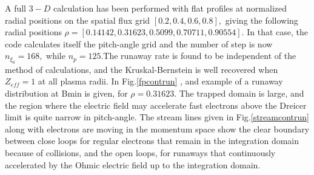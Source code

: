 A full $3-D$ calculation has been performed with flat profiles at normalized
radial positions on the spatial flux grid $\left[ 0.2,0.4,0.6,0.8\right] ,$
giving the following radial positions $\rho =\left[
0.14142,0.31623,0.5099,0.70711,0.90554\right] $. In that case, the code
calculates itself the pitch-angle grid and the number of step is now $n_{\xi
_{0}}=168,$ while $n_{p}=125.$The runaway rate is found to be independent of
the method of calculations, and the Kruskal-Bernstein is well recovered when
$Z_{eff}=1$ at all plasma radii. In Fig.\ref{fpcontrun} , and example of a
runaway distribution at Bmin is given, for $\rho =0.31623.$ The trapped
domain is large, and the region where the electric field may accelerate fast
electrons above the Dreicer limit is quite narrow in pitch-angle. The stream
lines given in Fig.\ref{streamcontrun} along with electrons are moving in
the momentum space show the clear boundary between close loops for regular
electrons that remain in the integration domain because of collisions, and
the open loops, for runaways that continuously accelerated by the Ohmic
electric field up to the integration domain.



